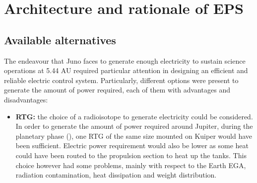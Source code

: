 \section{Architecture and rationale of EPS}
\label{sec:EPS_architecture_rationale}

\subsection{Available alternatives}
\label{subsec:available_alternatives}

The endeavour that Juno faces to generate enough electricity to sustain science operations at 5.44 AU required particular attention in designing an efficient and reliable electric control system. Particularly, different options were present to generate the amount of power required, each of them with advantages and disadvantages:

\begin{itemize}
    \item \textbf{RTG:} the choice of a radioisotope to generate electricity could be considered. In order to generate the amount of power required around Jupiter, during the planetary phase 
    (\mref), 
    one RTG of the same size mounted on Kuiper would have been sufficient. Electric power requirement would also be lower as some heat could have been routed to the propulsion section to heat up the tanks. This choice however had some problems, mainly with respect to the Earth EGA, radiation contamination, heat dissipation  and weight distribution.  %
\end{itemize}